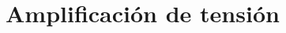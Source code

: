 \documentclass[10pt,a4paper]{article}
\begin{document}
		\section{Amplificación de tensión}
			
						
%			
%		
%			
%		
%			
%	
%			
%	
%			
%	
%			
%		
%			
%	
%			
%			
%			
\end{document}
